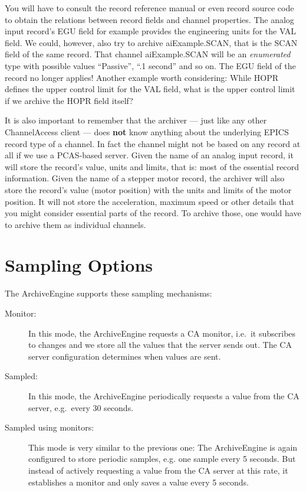 \NOTE You will have to consult the record reference manual or even
record source code to obtain the relations between record fields and
channel properties. The analog input record's EGU field for example
provides the engineering units for the VAL field. We could, however,
also try to archive aiExample.SCAN, that is the SCAN field of the same
record. That channel aiExample.SCAN will be an \emph{enumerated} type
with possible values ``Passive'', ``.1 second'' and so on. The EGU
field of the record no longer applies!
Another example worth considering: While HOPR defines the upper
control limit for the VAL field, what is the upper control limit if we
archive the HOPR field itself?

It is also important to remember that the archiver
--- just like any other ChannelAccess client --- does {\bfseries not} know
anything about the underlying EPICS record type of a channel. In fact
the channel might not be based on any record at all if we use a
PCAS-based server.
Given the name of an analog input record, it will store the record's
value, units and limits, that is: most of the essential record
information. Given the name of a stepper motor record, the
archiver will also store the record's value (motor position) with the
units and limits of the motor position. It will not store the
acceleration, maximum speed or other details that you might consider
essential parts of the record. To archive those, one would have to
archive them as individual channels.

\section{Sampling Options} \label{sec:sampling} %
The ArchiveEngine supports these sampling mechanisms:
\begin{description}
\item[\sffamily Monitor:]
In this mode, the ArchiveEngine requests a CA monitor, i.e.\ it
subscribes to changes and we store all the values that the server
sends out. The CA server configuration determines when values are sent.

\item[\sffamily Sampled:]
In this mode, the ArchiveEngine periodically requests a value from
the CA server, e.g.\ every 30 seconds.

\item[\sffamily Sampled using monitors:]
This mode is very similar to the previous one:
The ArchiveEngine is again configured to store periodic samples,
e.g. one sample every 5 seconds. But instead of actively requesting a
value from the CA server at this rate, it establishes a monitor and
only saves a value every 5 seconds.
\end{description}

